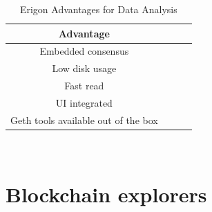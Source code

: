 \documentclass[11pt,a4paper,titlepage]{scrartcl}
\begin{document}
\begin{table}[ht]
\centering
\caption{Erigon Advantages for Data Analysis}
\begin{tabular}{cccc} \hline\hline
\textbf{Advantage} \\ \midrule
Embedded consensus \\
Low disk usage \\
Fast read \\
UI integrated \\
Geth tools available out of the box \\ \bottomrule
\end{tabular}\\
\label{tab:adverigon}
\end{table}

\newpage


\section{Blockchain explorers}
\end{document}
